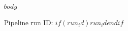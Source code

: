 \documentclass[11pt]{article}
\begin{document}
$body$

\vspace{1.5em}
{\small Pipeline run ID: $if(run_id)$$run_id$$endif$}
\end{document}

